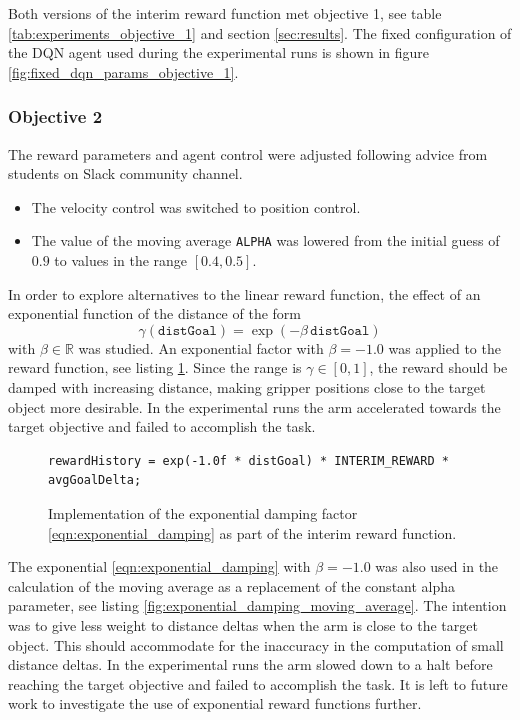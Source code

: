 \documentclass[11pt, onecolumn, oneside, reqno]{amsart}
\begin{document}
Both versions of the interim reward function met objective 1, see table \ref{tab:experiments_objective_1} and section \ref{sec:results}. The fixed configuration of the DQN agent used during the experimental runs is shown in figure \ref{fig:fixed_dqn_params_objective_1}.

\subsubsection{Objective 2}
The reward parameters and agent control were adjusted following advice from students on Slack community channel.
\begin{itemize}
\item The velocity control was switched to position control.
\item The value of the moving average \texttt{ALPHA} was lowered from the initial guess of $0.9$ to values in the range $\left[0.4, 0.5\right]$.
\end{itemize}

In order to explore alternatives to the linear reward function, the effect of an exponential function of the distance of the form
\begin{equation}
\label{eqn:exponential_damping}
\gamma \left(\mathtt{distGoal}\right) = \exp \left( -\beta \, \mathtt{distGoal} \right)
\end{equation}
with $\beta \in \mathbb{R}$ was studied. An exponential factor with $\beta = -1.0$ was applied to the reward function, see listing \ref{fig:exponential_damping_reward}. Since the range is $\gamma  \in \left[0, 1\right]$, the reward should be damped with increasing distance, making gripper positions close to the target object more desirable. In the experimental runs the arm accelerated towards the target objective and failed to accomplish the task.

\begin{figure}[thpb]
\centering
\begin{lstlisting}
rewardHistory = exp(-1.0f * distGoal) * INTERIM_REWARD * avgGoalDelta;
\end{lstlisting}
\caption{Implementation of the exponential damping factor \ref{eqn:exponential_damping} as part of the interim reward function.}
\label{fig:exponential_damping_reward}
\end{figure}

The exponential \ref{eqn:exponential_damping} with $\beta = -1.0$ was also used in the calculation of the moving average as a replacement of the constant alpha parameter, see listing \ref{fig:exponential_damping_moving_average}. The intention was to give less weight to distance deltas when the arm is close to the target object. This should accommodate for the inaccuracy in the computation of small distance deltas. In the experimental runs the arm slowed down to a halt before reaching the target objective and failed to accomplish the task. It is left to future work to investigate the use of exponential reward functions further.
\end{document}

